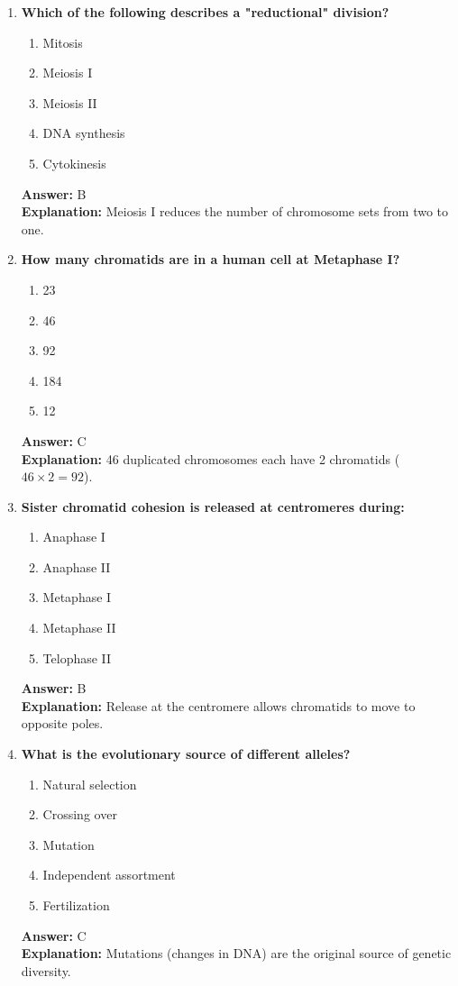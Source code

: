 \documentclass[11pt, a4paper]{article}
\begin{document}
\begin{enumerate}[leftmargin=*, label=\arabic*.]
\item \textbf{Which of the following describes a "reductional" division?}
\begin{enumerate}[label=\Alph*.]
\item Mitosis
\item Meiosis I
\item Meiosis II
\item DNA synthesis
\item Cytokinesis
\end{enumerate}
\textbf{Answer:} B \\
\textbf{Explanation:} Meiosis I reduces the number of chromosome sets from two to one.

\item \textbf{How many chromatids are in a human cell at Metaphase I?}
\begin{enumerate}[label=\Alph*.]
\item 23
\item 46
\item 92
\item 184
\item 12
\end{enumerate}
\textbf{Answer:} C \\
\textbf{Explanation:} 46 duplicated chromosomes each have 2 chromatids ($46 \times 2 = 92$).

\item \textbf{Sister chromatid cohesion is released at centromeres during:}
\begin{enumerate}[label=\Alph*.]
\item Anaphase I
\item Anaphase II
\item Metaphase I
\item Metaphase II
\item Telophase II
\end{enumerate}
\textbf{Answer:} B \\
\textbf{Explanation:} Release at the centromere allows chromatids to move to opposite poles.

\item \textbf{What is the evolutionary source of different alleles?}
\begin{enumerate}[label=\Alph*.]
\item Natural selection
\item Crossing over
\item Mutation
\item Independent assortment
\item Fertilization
\end{enumerate}
\textbf{Answer:} C \\
\textbf{Explanation:} Mutations (changes in DNA) are the original source of genetic diversity.


\end{enumerate}
\end{document}
